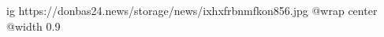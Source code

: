  
 
 
 
 

\ifcmt
  ig https://donbas24.news/storage/news/ixhxfrbnmfkon856.jpg
  @wrap center
  @width 0.9
\fi
